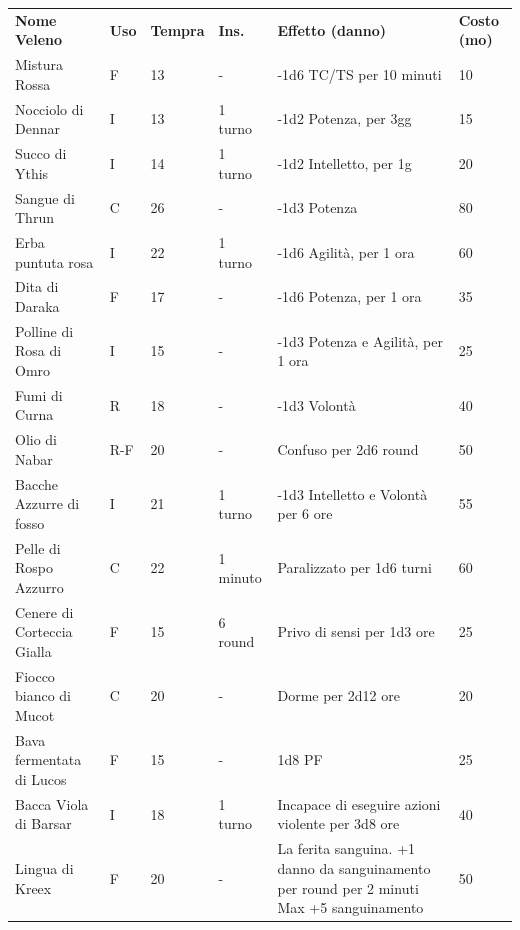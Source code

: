 \documentclass[a4paper,11pt,twoside,openany]{book}
\begin{document}
\begin{tabularx}{0.95\textwidth}{XlllXl}
\toprule
	\textbf{Nome Veleno}  & \textbf{Uso} & \textbf{Tempra} & \textbf{Ins.} & \textbf{Effetto (danno)} & \textbf{Costo (mo)}\\
	Mistura Rossa \index{Mistura Rossa}   & F  & 13    & -  & -1d6 TC/TS per 10 minuti   & 10\\
	Nocciolo di Dennar \index{Nocciolo di Dennar}  & I  & 13    & 1 turno  & -1d2 Potenza, per 3gg    & 15\\
	Succo di Ythis\index{Succo di Ythis} & I  & 14    & 1 turno  & -1d2 Intelletto, per 1g  & 20\\
	Sangue di Thrun \index{Sangue di Thrun}   & C  & 26    & -   & -1d3 Potenza   & 80\\
	Erba puntuta rosa \index{Erba puntuta rosa}    & I  & 22    & 1 turno  & -1d6 Agilità, per 1 ora  & 60\\
	Dita di Daraka\index{Dita di Daraka} & F  & 17    & -   & -1d6 Potenza, per 1 ora   & 35\\
	Polline di Rosa di Omro\index{Polline di Rosa di Omro}   & I  & 15    & -   & -1d3 Potenza e Agilità, per 1 ora   & 25\\
	Fumi di Curna\index{Fumi di Curna}   & R  & 18    & -   & -1d3 Volontà   & 40\\
	Olio di Nabar \index{Olio di Nabar}  & R-F& 20    & -   & Confuso per 2d6 round    & 50\\
	Bacche Azzurre di fosso \index{Bacche Azzurre di fosso}  & I  & 21    & 1 turno  & -1d3 Intelletto e Volontà per 6 ore& 55\\
	Pelle di Rospo Azzurro \index{Pelle di Rospo Azzurro}    & C  & 22    & 1 minuto & Paralizzato per 1d6 turni& 60\\
	Cenere di Corteccia Gialla \index{Cenere di Corteccia Gialla} & F  & 15    & 6 round  & Privo di sensi per 1d3 ore    & 25\\
	Fiocco bianco di Mucot \index{Fiocco bianco di Mucot}    & C  & 20    & -   & Dorme per 2d12 ore  & 20\\
	Bava fermentata di Lucos \index{Bava fermentata di Lucos}& F  & 15    & -   & 1d8 PF    & 25\\
	Bacca Viola di Barsar\index{Bacca Viola di Barsar}  & I  & 18    & 1 turno  & Incapace di eseguire azioni violente per 3d8 ore  & 40   \\
	Lingua di Kreex \index{Lingua di Kreex}   & F  & 20    & -   & La ferita sanguina. +1 danno da sanguinamento per round per 2 minuti Max +5 sanguinamento & 50   \\

\end{tabularx}
\end{document}
